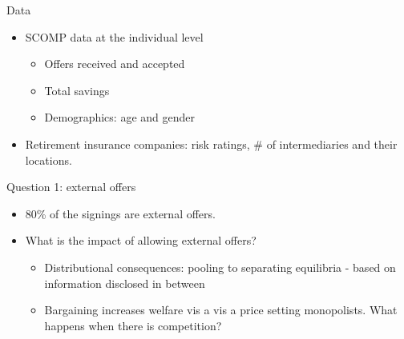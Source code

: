 \documentclass[notes, 10pt,aspectratio=169]{beamer}
\begin{document}
 \begin{frame}{Data}
\begin{itemize}
    \item SCOMP data at the individual level  
    \begin{itemize}
        \item Offers received and accepted 
        \item Total savings 
        \item Demographics: age and gender
    \end{itemize}
     \item Retirement insurance companies: risk ratings, \#  of intermediaries and their  locations.
\end{itemize}


\end{frame}



\begin{frame}{Question 1: external offers}

\begin{itemize}
   
    \item 80\% of the signings are external offers. 
    \item What is the impact of allowing external offers? 

    \begin{itemize}
        \item Distributional consequences: pooling to separating equilibria - based on information disclosed in between


        \item Bargaining increases welfare vis a vis a price setting monopolists. What happens when there is competition? 
\end{itemize}   
\end{itemize}
\end{frame}
\end{document}
